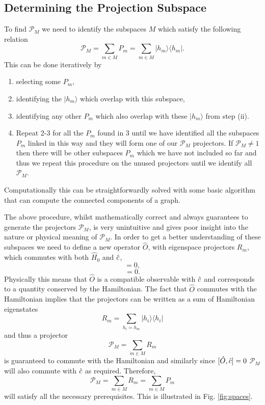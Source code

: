 \subsection{Determining the Projection Subspace}

To find $\mathcal{P}_M$ we need to identify the subspaces $M$ which
satisfy the following relation
\begin{equation}
\mathcal{P}_M = \sum_{m \in M} P_m = \sum_{m \in M} | h_m \rangle
\langle h_m |.
\end{equation}
This can be done iteratively by 
\begin{enumerate}
  \item selecting some $P_m$, 
  \item identifying the $| h_m \rangle$ which overlap with this
    subspace,
  \item identifying any other $P_m$ which also overlap with these
    $| h_m \rangle$ from step (ii). 
  \item Repeat 2-3 for all the $P_m$ found in 3 until we
    have identified all the subspaces $P_m$ linked in this way and
    they will form one of our $\mathcal{P}_M$ projectors. If
    $\mathcal{P}_M \ne 1$ then there will be other subspaces $P_m$
    which we have not included so far and thus we repeat this
    procedure on the unused projectors until we identify all
    $\mathcal{P}_M$.
\end{enumerate}
Computationally this can be straightforwardly solved with some basic
algorithm that can compute the connected components of a graph.

The above procedure, whilst mathematically correct and always
guarantees to generate the projectors $\mathcal{P}_M$, is very
unintuitive and gives poor insight into the nature or physical meaning
of $\mathcal{P}_M$. In order to get a better understanding of these
subspaces we need to define a new operator $\hat{O}$, with eigenspace
projectors $R_m$, which commutes with both $\hat{H}_0$ and
$\hat{c}$,
\begin{equation}
  [\hat{O}, \hat{H}_0 ] = 0,
\end{equation}
\begin{equation}
  [\hat{O}, \c] = 0. 
\end{equation}
Physically this means that $\hat{O}$ is a compatible observable with
$\hat{c}$ and corresponds to a quantity conserved by the Hamiltonian. The
fact that $\hat{O}$ commutes with the Hamiltonian implies that the
projectors can be written as a sum of Hamiltonian eigenstates
\begin{equation}
  R_m = \sum_{h_i = h_m} | h_i \rangle \langle h_i |
\end{equation}
and thus a projector 
\begin{equation}
\mathcal{P}_M = \sum_{m \in M} R_m
\end{equation}
is guaranteed to commute with the Hamiltonian and similarly since
$[\hat{O}, \hat{c}] = 0$ $\mathcal{P}_M$ will also commute with $\hat{c}$ as
required. Therefore,
\begin{equation}
\mathcal{P}_M = \sum_{m \in M} R_m = \sum_{m \in M} P_m
\end{equation} 
will satisfy all the necessary prerequisites. This is illustrated in
Fig. \ref{fig:spaces}.

